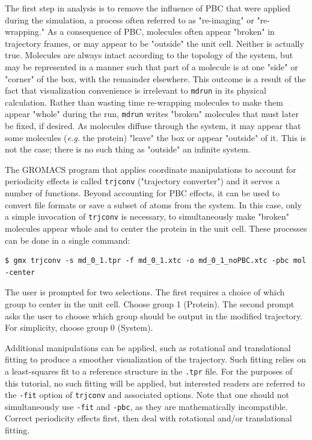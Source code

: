 \documentclass[9pt,tutorial,pubversion]{livecoms}
\begin{document}
The first step in analysis is to remove the influence of PBC that were applied during the simulation, a process often referred to as "re-imaging" or "re-wrapping." As a consequence of PBC, molecules often appear "broken" in trajectory frames, or may appear to be "outside" the unit cell. Neither is actually true. Molecules are always intact according to the topology of the system, but may be represented in a manner such that part of a molecule is at one "side" or "corner" of the box, with the remainder elsewhere. This outcome is a result of the fact that visualization convenience is irrelevant to \texttt{mdrun} in its physical calculation. Rather than wasting time re-wrapping molecules to make them appear "whole" during the run, \texttt{mdrun} writes "broken" molecules that must later be fixed, if desired. As molecules diffuse through the system, it may appear that some molecules ({\em e.g.} the protein) "leave" the box or appear "outside" of it. This is not the case; there is no such thing as "outside" an infinite system.

The GROMACS program that applies coordinate manipulations to account for periodicity effects is called \texttt{trjconv} ("trajectory converter") and it serves a number of functions. Beyond accounting for PBC effects, it can be used to convert file formats or save a subset of atoms from the system. In this case, only a simple invocation of \texttt{trjconv} is necessary, to simultaneously make "broken" molecules appear whole and to center the protein in the unit cell. These processes can be done in a single command:

\begin{lstlisting}
$ gmx trjconv -s md_0_1.tpr -f md_0_1.xtc -o md_0_1_noPBC.xtc -pbc mol -center
\end{lstlisting}

The user is prompted for two selections. The first requires a choice of which group to center in the unit cell. Choose group 1 (Protein). The second prompt asks the user to choose which group should be output in the modified trajectory. For simplicity, choose group 0 (System).

Additional manipulations can be applied, such as rotational and translational fitting to produce a smoother visualization of the trajectory. Such fitting relies on a least-squares fit to a reference structure in the \texttt{.tpr} file. For the purposes of this tutorial, no such fitting will be applied, but interested readers are referred to the \texttt{-fit} option of \texttt{trjconv} and associated options. Note that one should not simultaneously use \texttt{-fit} and \texttt{-pbc}, as they are mathematically incompatible. Correct periodicity effects first, then deal with rotational and/or translational fitting.
\end{document}

